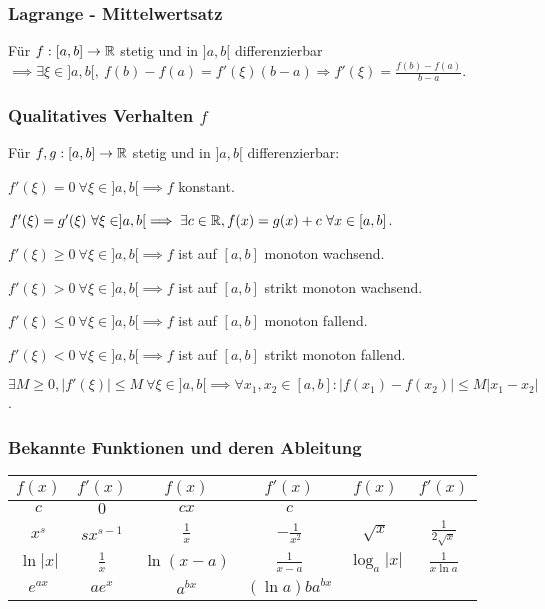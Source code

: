 \subsubsection{Lagrange - Mittelwertsatz}
Für $f:[a,b] \to \mathbb{R}$ stetig und in $]a,b[$ differenzierbar $\implies \exists \xi \in ]a,b[, \ f(b) - f(a) = f'(\xi)(b - a) \Rightarrow f'(\xi) = \frac{f(b) - f(a)}{b - a}$.

\subsubsection{Qualitatives Verhalten $f$}
Für $f,g: [a,b] \to \mathbb{R}$ stetig und in $]a, b[$ differenzierbar:
\begin{compactenum}
    \item $f'(\xi) = 0 \ \forall \xi \in ]a, b[ \implies f$ konstant.
    \item $f'(\xi) = g'(\xi) \ \forall \xi \in ]a, b[ \implies \exists c \in \mathbb{R}, f(x) = g(x) + c \ \forall x \in [a,b]$.
    \item $f'(\xi) \ge 0 \ \forall \xi \in ]a, b[ \implies f$ ist auf $[a,b]$ monoton wachsend.
    \item $f'(\xi) > 0 \ \forall \xi \in ]a, b[ \implies f$ ist auf $[a,b]$ strikt monoton wachsend.
    \item $f'(\xi) \le 0 \ \forall \xi \in ]a, b[ \implies f$ ist auf $[a,b]$ monoton fallend.
    \item $f'(\xi) < 0 \ \forall \xi \in ]a, b[ \implies f$ ist auf $[a,b]$ strikt monoton fallend.
    \item $\exists M \ge 0, |f'(\xi)| \le M \ \forall \xi \in ]a,b[ \implies \forall x_1, x_2 \in [a,b] : |f(x_1) - f(x_2)| \le M|x_1 - x_2|$.
\end{compactenum}

\subsubsection{Bekannte Funktionen und deren Ableitung}
\begin{tabular}{c | c || c | c || c | c}
    $f(x)$ & $f'(x)$    & $f(x)$ & $f'(x)$    & $f(x)$        & $f'(x)$\\\hline
    $c$    & $0$        & $cx$          & $c$              & \\\hline
    $x^s$  & $sx^{s-1}$ & $\frac{1}{x}$ & $-\frac{1}{x^2}$ & $\sqrt{x}$ & $\frac{1}{2\sqrt{x}}$\\\hline
    $\ln|x|$ & $\frac{1}{x}$ & $\ln(x - a)$ & $\frac{1}{x - a}$ & $\log_a|x|$ & $\frac{1}{x \ln a}$\\\hline
    $e^{ax}$ & $ae^x$ & $a^{bx}$ & $(\ln a)b a^{b x}$ & \\\hline

\end{tabular}

